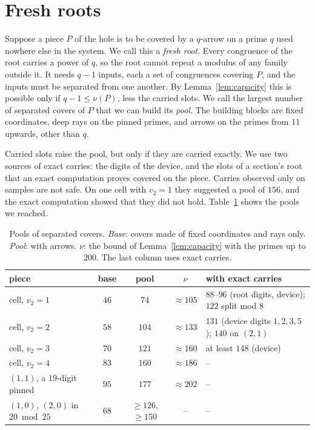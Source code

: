 \documentclass[11pt]{amsart}
\theoremstyle{definition}
\theoremstyle{remark}
\begin{document}
\section{Fresh roots}\label{sec:roots}

Suppose a piece $P$ of the hole is to be covered by a $q$-arrow on a prime $q$ used nowhere else in the system. We
call this a \emph{fresh root}. Every congruence of the root carries a power of $q$, so the root cannot repeat a
modulus of any family outside it. It needs $q-1$ inputs, each a set of congruences covering $P$, and the inputs must
be separated from one another. By Lemma~\ref{lem:capacity} this is possible only if $q-1\le\nu(P)$, less the carried
slots. We call the largest number of separated covers of $P$ that we can build its \emph{pool}. The building blocks
are fixed coordinates, deep rays on the pinned primes, and arrows on the primes from $11$ upwards, other than $q$.

Carried slots raise the pool, but only if they are carried exactly. We use two sources of exact carries: the digits
of the device, and the slots of a section's root that an exact computation proves covered on the piece. Carries
observed only on samples are not safe. On one cell with $v_2=1$ they suggested a pool of $156$, and the exact
computation showed that they did not hold. Table~\ref{tab:pools} shows the pools we reached.

\begin{table}[ht]
\centering
\caption{Pools of separated covers. \emph{Base}: covers made of fixed coordinates and rays only. \emph{Pool}: with
arrows. $\nu$: the bound of Lemma~\ref{lem:capacity} with the primes up to $200$. The last column uses exact carries.}\label{tab:pools}
{\small
\begin{tabular}{@{}lcccl@{}}
\toprule
piece & base & pool & $\nu$ & with exact carries\\
\midrule
cell, $v_2=1$ & $46$ & $74$ & $\approx105$ & $88$--$96$ (root digits, device); $122$ split mod $8$\\
cell, $v_2=2$ & $58$ & $104$ & $\approx133$ & $131$ (device digits $1,2,3,5$); $140$ on $(2,1)$\\
cell, $v_2=3$ & $70$ & $121$ & $\approx160$ & at least $148$ (device)\\
cell, $v_2=4$ & $83$ & $160$ & $\approx186$ & --\\
$(1,1)$, a $19$-digit pinned & $95$ & $177$ & $\approx202$ & --\\
$(1,0)$, $(2,0)$ in $20 \bmod 25$ & $68$ & $\ge126$, $\ge150$ & -- & --\\
\bottomrule
\end{tabular}}
\end{table}
\end{document}
